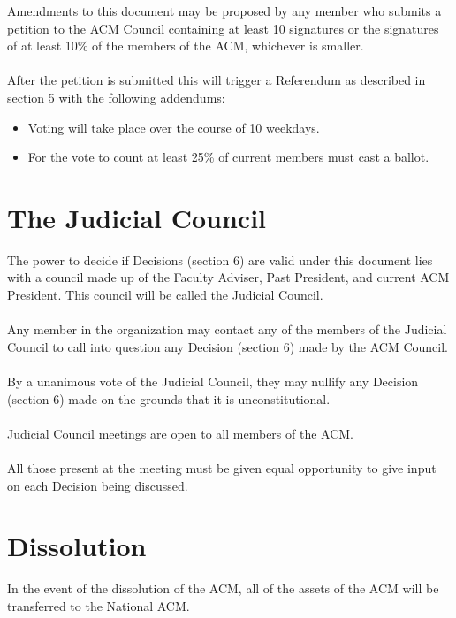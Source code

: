 \documentclass[12pt,titlepage]{article}
\begin{document}
Amendments to this document may be proposed by any member who submits a petition to the ACM Council containing at least 10 signatures or the signatures of at least 10\% of the members of the ACM, whichever is smaller.\\
\\
After the petition is submitted this will trigger a Referendum as described in section 5 with the following addendums:
\begin{itemize}
	\item Voting will take place over the course of 10 weekdays.
	\item For the vote to count at least 25\% of current members must cast a ballot.
\end{itemize}

\section{The Judicial Council}

The power to decide if Decisions (section 6) are valid under this document lies with a council made up of the Faculty Adviser, Past President, and current ACM President. This council will be called the Judicial Council.\\
\\
Any member in the organization may contact any of the members of the Judicial Council to call into question any Decision (section 6) made by the ACM Council.\\
\\
By a unanimous vote of the Judicial Council, they may nullify any Decision (section 6) made on the grounds that it is unconstitutional.\\
\\
Judicial Council meetings are open to all members of the ACM.\\
\\
All those present at the meeting must be given equal opportunity to give input on each Decision being discussed.

\section{Dissolution}

In the event of the dissolution of the ACM, all of the assets of the ACM will be transferred to the National ACM.
\end{document}
